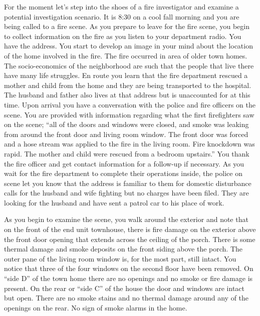 \documentclass[twoside]{uocthesis}
\begin{document}
{For the moment let's step into the shoes of a fire investigator and examine a potential investigation scenario.  It is 8:30 on a cool fall morning and you are being called to a fire scene.  As you prepare to leave for the fire scene, you begin to collect information on the fire as you listen to your department radio.  You have the address.  You start to develop an image in your mind about the location of the home involved in the fire. The fire occurred in area of older town homes.  The socio-economics of the neighborhood are such that the people that live there have many life struggles. En route you learn that the fire department rescued a mother and child from the home and they are being transported to the hospital.  The husband and father also lives at that address but is unaccounted for at this time.  Upon arrival you have a conversation with the police and fire officers on the scene.  You are provided with information regarding what the first firefighters saw on the scene; ``all of the doors and windows were closed, and smoke was leaking from around the front door and living room window.  The front door was forced and a hose stream was applied to the fire in the living room.  Fire knockdown was rapid.  The mother and child were rescued from a bedroom upstairs.'' You thank the fire officer and get contact information for a follow-up if necessary.  As you wait for the fire department to complete their operations inside, the police on scene let you know that the address is familiar to them for domestic disturbance calls for the husband and wife fighting but no charges have been filed.  They are looking for the husband and have sent a patrol car to his place of work.  

As you begin to examine the scene, you walk around the exterior and note that on the front of the end unit townhouse, there is fire damage on the exterior above the front door opening that extends across the ceiling of the porch.  There is some thermal damage and smoke deposits on the front siding above the porch.  The outer pane of the living room window is, for the most part, still intact. You notice that three of the four windows on the second floor have been removed.  On ``side D'' of the town home there are no openings and no smoke or fire damage is present.  On the rear or ``side C'' of the house the door and windows are intact but open.  There are no smoke stains and no thermal damage around any of the openings on the rear. No sign of smoke alarms in the home. 

}
\end{document}
